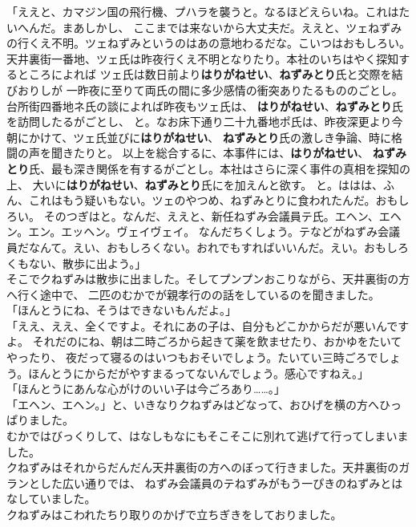 \documentclass[
a4paper,
10pt,
book]
{tarticle}
\begin{document}
「ええと、カマジン国の飛行機、プハラを襲うと。なるほどえらいね。これはたいへんだ。まあしかし、
ここまでは来ないから大丈夫だ。ええと、ツェねずみの行くえ不明。ツェねずみというのはあの意地わるだな。こいつはおもしろい。\\
\indent 天井裏街一番地、ツェ氏は昨夜行くえ不明となりたり。本社のいちはやく探知するところによれば
ツェ氏は数日前より\textbf{はりがねせい}、\textbf{ねずみとり}氏と交際を結びおりしが
一昨夜に至りて両氏の間に多少感情の衝突ありたるもののごとし。台所街四番地ネ氏の談によれば昨夜もツェ氏は、
\textbf{はりがねせい}、\textbf{ねずみとり}氏を訪問したるがごとし、
と。なお床下通り二十九番地ポ氏は、昨夜深更より今朝にかけて、ツェ氏並びに\textbf{はりがねせい}、
\textbf{ねずみとり}氏の激しき争論、時に格闘の声を聞きたりと。
以上を総合するに、本事件には、\textbf{はりがねせい}、
\textbf{ねずみとり}氏、最も深き関係を有するがごとし。本社はさらに深く事件の真相を探知の上、
大いに\textbf{はりがねせい}、\textbf{ねずみとり}氏にを加えんと欲す。
と。ははは、ふん、これはもう疑いもない。ツェのやつめ、ねずみとりに食われたんだ。おもしろい。
そのつぎはと。なんだ、ええと、新任ねずみ会議員テ氏。エヘン、エヘン。エン。エッヘン。ヴェイヴェイ。
なんだちくしょう。テなどがねずみ会議員だなんて。えい、おもしろくない。おれでもすればいいんだ。えい。おもしろくもない、散歩に出よう。」\\
\indent そこでクねずみは散歩に出ました。そしてプンプンおこりながら、天井裏街の方へ行く途中で、
二匹のむかでが親孝行のの話をしているのを聞きました。\indent \\
「ほんとうにね、そうはできないもんだよ。」\\
「ええ、ええ、全くですよ。それにあの子は、自分もどこかからだが悪いんですよ。
それだのにね、朝は二時ごろから起きて薬を飲ませたり、おかゆをたいてやったり、
夜だって寝るのはいつもおそいでしょう。たいてい三時ごろでしょう。ほんとうにからだがやすまるってないんでしょう。感心ですねえ。」\\
「ほんとうにあんな心がけのいい子は今ごろあり……。」\\
「エヘン、エヘン。」と、いきなりクねずみはどなって、おひげを横の方へひっぱりました。\\
\indent むかではびっくりして、はなしもなにもそこそこに別れて逃げて行ってしまいました。\\
\indent クねずみはそれからだんだん天井裏街の方へのぼって行きました。天井裏街のガランとした広い通りでは、
ねずみ会議員のテねずみがもう一ぴきのねずみとはなしていました。\\
\indent クねずみはこわれたちり取りのかげで立ちぎきをしておりました。\\
\end{document}
